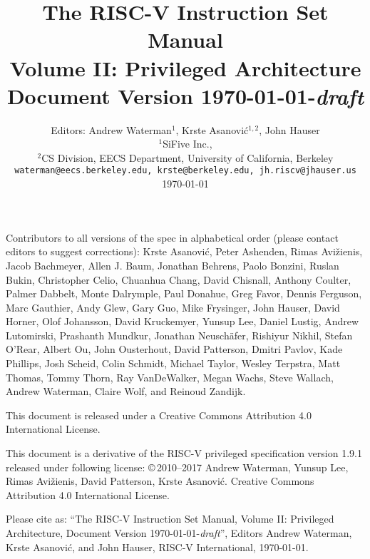 \documentclass[twoside,11pt]{book}
\newcommand{\privrev}{\mbox{\yyyymmdd\today-{\em draft}}}
\newcommand{\privmonthyear}{\mbox{\monthyeardate\today}}
\begin{document}
\title{\vspace{-0.7in}\Large {\bf The RISC-V Instruction Set Manual} \\
  \large {\bf Volume II: Privileged Architecture} \\
  Document Version \privrev
  \vspace{-0.1in}}

\author{Editors: Andrew Waterman$^{1}$, Krste Asanovi\'{c}$^{1,2}$, John Hauser \\
  $^{1}$SiFive Inc., \\
  $^{2}$CS Division, EECS Department, University of California, Berkeley \\
  {\tt waterman@eecs.berkeley.edu, krste@berkeley.edu, jh.riscv@jhauser.us} \\
  \monthdayyeardate\today
}

\date{} 
\maketitle

Contributors to all versions of the spec in alphabetical order (please contact
editors to suggest corrections): Krste Asanovi\'{c}, Peter Ashenden, Rimas
Avi\v{z}ienis, Jacob Bachmeyer, Allen J. Baum, Jonathan Behrens, Paolo Bonzini, Ruslan Bukin,
Christopher Celio, Chuanhua Chang, David Chisnall, Anthony Coulter, Palmer Dabbelt, Monte
Dalrymple, Paul Donahue, Greg Favor, Dennis Ferguson,  Marc Gauthier, Andy Glew,
Gary Guo, Mike Frysinger, John Hauser, David Horner, Olof
Johansson, David Kruckemyer, Yunsup Lee, Daniel Lustig, Andrew Lutomirski, Prashanth Mundkur,
Jonathan Neusch{\"a}fer, Rishiyur
Nikhil, Stefan O'Rear, Albert Ou, John Ousterhout, David Patterson, Dmitri
Pavlov, Kade Phillips, Josh Scheid, Colin Schmidt, Michael Taylor, Wesley Terpstra, Matt Thomas, Tommy Thorn, Ray
VanDeWalker, Megan Wachs, Steve Wallach, Andrew Waterman, Claire Wolf,
and Reinoud Zandijk.

This document is released under a Creative Commons Attribution 4.0
International License.

This document is a derivative of the RISC-V
privileged specification version 1.9.1 released under following license:
\copyright \,2010--2017 Andrew Waterman, Yunsup Lee, Rimas
Avi\v{z}ienis, David Patterson, Krste Asanovi\'{c}. 
Creative Commons Attribution 4.0 International License.

Please cite as: ``The RISC-V Instruction Set
Manual, Volume II: Privileged Architecture, Document Version \privrev'', Editors
Andrew Waterman, Krste Asanovi\'{c}, and John Hauser, RISC-V International, \privmonthyear.
\end{document}
